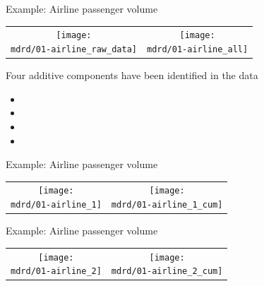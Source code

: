 \begin{frame}{Example: Airline passenger volume}
\newcommand{\wmgd}{0.5\columnwidth}
\newcommand{\hmgd}{3.0cm}
\newcommand{\mdrd}{../figures/01-airline}
\newcommand{\mbm}{\hspace{-0.3cm}}
\begin{tabular}{cc}
\mbm \texttt{[image: \\mdrd/01-airline\_raw\_data]} & \texttt{[image: \\mdrd/01-airline\_all]}
\end{tabular}

{\footnotesize
Four additive components have been identified in the data
\begin{itemize}

  \item  

  \item  

  \item  

  \item  

\end{itemize}
}
\end{frame}

\begin{frame}{Example: Airline passenger volume}
\newcommand{\wmgd}{0.5\columnwidth}
\newcommand{\hmgd}{3.0cm}
\newcommand{\mdrd}{../figures/01-airline}
\newcommand{\mbm}{\hspace{-0.3cm}}
{\footnotesize

}

\vspace{\baselineskip}

\begin{tabular}{cc}
\mbm \texttt{[image: \\mdrd/01-airline\_1]} & \texttt{[image: \\mdrd/01-airline\_1\_cum]}
\end{tabular}
\end{frame}

\begin{frame}{Example: Airline passenger volume}
\newcommand{\wmgd}{0.5\columnwidth}
\newcommand{\hmgd}{3.0cm}
\newcommand{\mdrd}{../figures/01-airline}
\newcommand{\mbm}{\hspace{-0.3cm}}
{\footnotesize

}

\vspace{\baselineskip}

\begin{tabular}{cc}
\mbm \texttt{[image: \\mdrd/01-airline\_2]} & \texttt{[image: \\mdrd/01-airline\_2\_cum]}
\end{tabular}
\end{frame}


